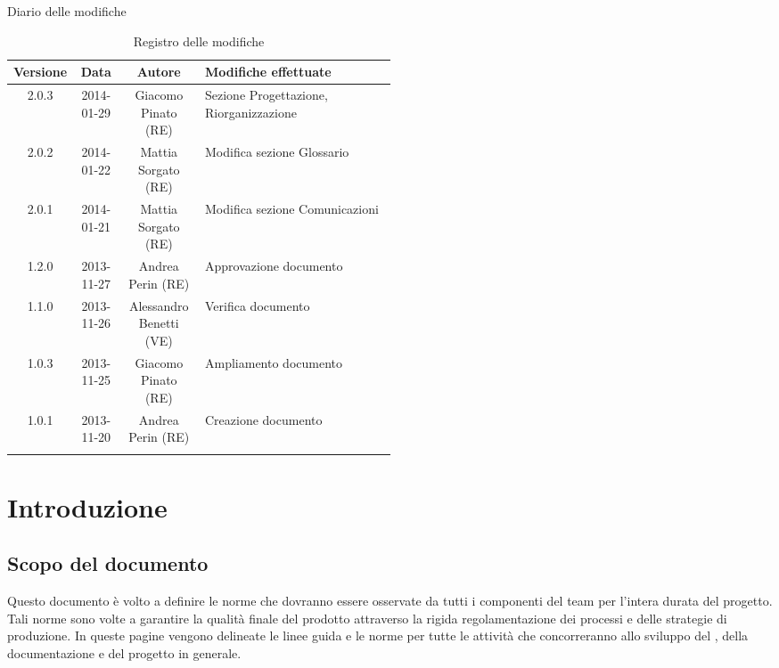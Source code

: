 
\newpage
Diario delle modifiche
\begin{center}
\begin{longtable}{|c|c|c|p{0.5\linewidth}|}
\toprule
\textbf{Versione} & \textbf{Data} & \textbf{Autore} & \textbf{Modifiche effettuate}\\

\midrule
2.0.3 & 2014-01-29 & Giacomo Pinato (RE) & Sezione Progettazione, Riorganizzazione\\
\midrule
2.0.2 & 2014-01-22 & Mattia Sorgato (RE) & Modifica sezione Glossario\\
\midrule
2.0.1 & 2014-01-21 & Mattia Sorgato (RE) & Modifica sezione Comunicazioni\\
\midrule
1.2.0 & 2013-11-27 & Andrea Perin (RE) & Approvazione documento\\
\midrule
1.1.0 & 2013-11-26 & Alessandro Benetti (VE) & Verifica documento\\
\midrule
1.0.3 & 2013-11-25 & Giacomo Pinato (RE) & Ampliamento documento\\
\midrule
1.0.1 & 2013-11-20 & Andrea Perin (RE) & Creazione documento\\

\bottomrule
\caption{Registro delle modifiche}
\label{tab:changelog}
\end{longtable}
\end{center}

\newpage
\tableofcontents


\newpage
\section{Introduzione}%
\label{1.0}
\subsection{Scopo del documento}%
\label{1.1}
Questo documento è volto a definire le norme che dovranno essere osservate da tutti i componenti del team per l'intera durata del progetto. Tali norme sono volte a garantire la qualità finale del prodotto attraverso la rigida regolamentazione dei processi e delle strategie di produzione. In queste pagine vengono delineate le linee guida e le norme per tutte le attività che concorreranno allo sviluppo del , della documentazione e del progetto in generale.

